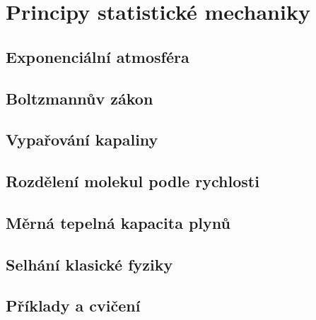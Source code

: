 \chapter{Principy statistické mechaniky}\label{fyz:IchapXL}
\minitoc
  \section{Exponenciální atmosféra}\label{fyz:IchapXLsecI}
  \section{Boltzmannův zákon}\label{fyz:IchapXLsecII}
  \section{Vypařování kapaliny}\label{fyz:IchapXLsecIII}
  \section{Rozdělení molekul podle rychlosti}\label{fyz:IchapXLsecIV}
  \section{Měrná tepelná kapacita plynů}\label{fyz:IchapXLsecV}
  \section{Selhání klasické fyziky}\label{fyz:IchapXLsecVI}
  \section{Příklady a cvičení}\label{fyz:IchapXLsecVII}